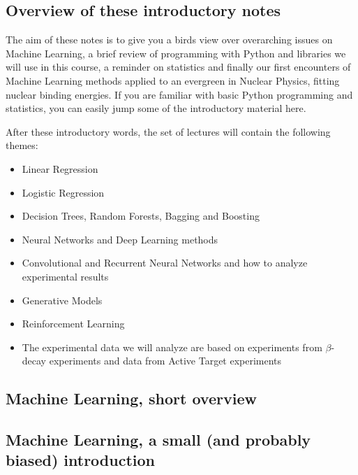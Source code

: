 \documentclass[%
oneside,                 %
final,                   %
10pt]{article}
\begin{document}
\subsection*{Overview of these introductory notes}

The aim of these notes is to give you a birds view over overarching issues on  Machine Learning, a brief review of programming with Python and libraries we will use in this course, a reminder on statistics and finally our first encounters of Machine Learning methods applied to an evergreen in Nuclear Physics, fitting nuclear binding energies.
If you are familiar with basic Python programming and statistics, you can easily jump some of the introductory material here.

After these introductory words, the set of lectures will contain the following themes:
\begin{itemize}
\item Linear Regression

\item Logistic Regression

\item Decision Trees, Random Forests, Bagging and Boosting

\item Neural Networks and Deep Learning methods

\item Convolutional and Recurrent Neural Networks and how to analyze experimental results

\item Generative Models

\item Reinforcement Learning

\item The experimental data we will analyze are based on experiments from $\beta$-decay experiments and data from Active Target experiments
\end{itemize}

\noindent


\subsection*{Machine Learning, short overview}


\subsection*{Machine Learning, a small (and probably biased) introduction}
\end{document}
